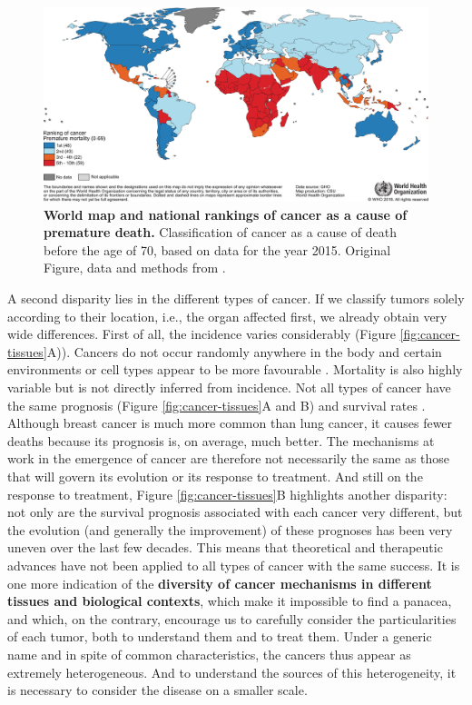 \documentclass[a4paper,12pt,twoside,onecolumn,openright,final,oldfontcommands]{memoir}
\begin{document}
\begin{figure}

{\centering \includegraphics[width=1\linewidth]{fig/globocan-map} 

}

\caption[World map and national rankings of cancer as a cause of premature death]{\textbf{World map and national rankings of
cancer as a cause of premature death.} Classification of cancer as a
cause of death before the age of 70, based on data for the year 2015.
Original Figure, data and methods from \citet{bray2018global}.}\label{fig:globocan-map}
\end{figure}






A second disparity lies in the different types of cancer. If we classify
tumors solely according to their location, i.e., the organ affected
first, we already obtain very wide differences. First of all, the
incidence varies considerably (Figure \ref{fig:cancer-tissues}A)).
Cancers do not occur randomly anywhere in the body and certain
environments or cell types appear to be more favourable
\citep{tomasetti2015variation}. Mortality is also highly variable but is
not directly inferred from incidence. Not all types of cancer have the
same prognosis (Figure \ref{fig:cancer-tissues}A and B) and survival
rates \citep{liu2018integrated}. Although breast cancer is much more
common than lung cancer, it causes fewer deaths because its prognosis
is, on average, much better. The mechanisms at work in the emergence of
cancer are therefore not necessarily the same as those that will govern
its evolution or its response to treatment. And still on the response to
treatment, Figure \ref{fig:cancer-tissues}B highlights another
disparity: not only are the survival prognosis associated with each
cancer very different, but the evolution (and generally the improvement)
of these prognoses has been very uneven over the last few decades. This
means that theoretical and therapeutic advances have not been applied to
all types of cancer with the same success. It is one more indication of
the \textbf{diversity of cancer mechanisms in different tissues and
biological contexts}, which make it impossible to find a panacea, and
which, on the contrary, encourage us to carefully consider the
particularities of each tumor, both to understand them and to treat
them. Under a generic name and in spite of common characteristics, the
cancers thus appear as extremely heterogeneous. And to understand the
sources of this heterogeneity, it is necessary to consider the disease
on a smaller scale.
\end{document}
